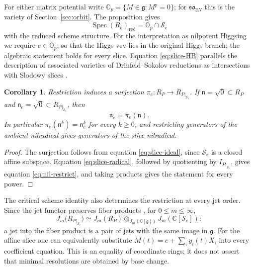 \documentclass[10pt,reqno]{amsart}
\numberwithin{equation}{section}
\theoremstyle{plain}
\newtheorem{corollary}[theorem]{Corollary}
\theoremstyle{definition}
\DeclareMathOperator{\Spec}{Spec}
\newcommand{\red}{\mathrm{red}}
\begin{document}
For either matrix potential write $\mathbb O_p=\{M\in\mathfrak{g}:M^p=0\}$; for $\mathfrak{so}_{2N}$ this is the variety of Section~\ref{sec:orbit}. The proposition gives
\begin{equation}\label{eq:slice-HB}
	\Spec(R_e)_\red=\mathbb O_p\cap\mathcal{S}_e
\end{equation}
with the reduced scheme structure. For the interpretation as nilpotent Higgsing we require $e\in\mathbb O_p$, so that the Higgs vev lies in the original Higgs branch; the algebraic statement holds for every slice. Equation \eqref{eq:slice-HB} parallels the description of associated varieties of Drinfeld--Sokolov reductions as intersections with Slodowy slices \cite{ArakawaW}.

\begin{corollary}\label{cor:nilradical}
Restriction induces a surjection $\pi_e:R_P\to R_{P|_{\mathcal{S}_e}}$. If $\mathfrak{n}=\sqrt0\subset R_P$ and $\mathfrak{n}_e=\sqrt0\subset R_{P|_{\mathcal{S}_e}}$, then
\begin{equation}\label{eq:nil-restrict}
	\mathfrak{n}_e=\pi_e(\mathfrak{n}).
\end{equation}
In particular $\pi_e(\mathfrak{n}^k)=\mathfrak{n}_e^k$ for every $k\ge0$, and restricting generators of the ambient nilradical gives generators of the slice nilradical.
\end{corollary}

\begin{proof}
The surjection follows from equation \eqref{eq:slice-ideal}, since $\mathcal{S}_e$ is a closed affine subspace. Equation \eqref{eq:slice-radical}, followed by quotienting by $I_{P|_{\mathcal{S}_e}}$, gives equation \eqref{eq:nil-restrict}, and taking products gives the statement for every power.
\end{proof}

The critical scheme identity also determines the restriction at every jet order. Since the jet functor preserves fiber products \cite{EM}, for $0\le m\le\infty$,
\begin{equation}\label{eq:jets-fiber}
	J_m\big(R_{P|_{\mathcal{S}_e}}\big)\simeq J_m(R_P)\otimes_{J_m(\mathbb{C}[\mathfrak{g}])}J_m(\mathbb{C}[\mathcal{S}_e]):
\end{equation}
a jet into the fiber product is a pair of jets with the same image in $\mathfrak{g}$. For the affine slice one can equivalently substitute $M(t)=e+\sum_iy_i(t)X_i$ into every coefficient equation. This is an equality of coordinate rings; it does not assert that minimal resolutions are obtained by base change.
\end{document}
